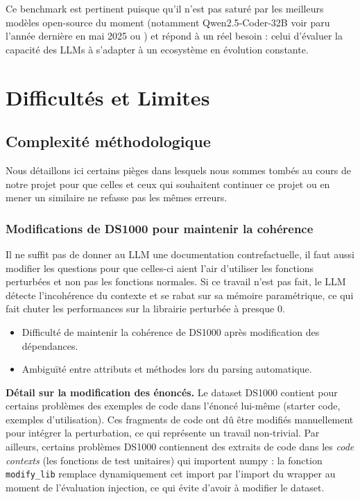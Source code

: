 \documentclass[11pt, a4paper]{article}
\begin{document}
Ce benchmark est pertinent puisque qu'il n'est pas saturé par les meilleurs modèles open-source du moment (notamment Qwen2.5-Coder-32B voir \cite{ouyang2025dscodebenchrealisticbenchmarkdata} paru l'année dernière en mai 2025 ou \cite{vellumbenchmark}) et répond à un réel besoin : celui d'évaluer la capacité des LLMs à s'adapter à un ecosystème en évolution constante.

\section{Difficultés et Limites}

\subsection{Complexité méthodologique}

Nous détaillons ici certains pièges dans lesquels nous sommes tombés au cours de notre projet pour que celles et ceux qui souhaitent continuer ce projet ou en mener un similaire ne refasse pas les mêmes erreurs.

\subsubsection{Modifications de DS1000 pour maintenir la cohérence}

Il ne suffit pas de donner au LLM une documentation contrefactuelle, il faut aussi modifier les questions pour que celles-ci aient l'air d'utiliser les fonctions perturbées et non pas les fonctions normales. Si ce travail n'est pas fait, le LLM détecte l'incohérence du contexte et se rabat sur sa mémoire paramétrique, ce qui fait chuter les performances sur la librairie perturbée à presque 0.

\begin{itemize}
    \item Difficulté de maintenir la cohérence de DS1000 après modification des dépendances.
    \item Ambiguïté entre attributs et méthodes lors du parsing automatique.
\end{itemize}

\textbf{Détail sur la modification des énoncés.} Le dataset DS1000 contient pour certains problèmes des exemples de code dans l'énoncé lui-même (starter code, exemples d'utilisation). Ces fragments de code ont dû être modifiés manuellement pour intégrer la perturbation, ce qui représente un travail non-trivial. Par ailleurs, certains problèmes DS1000 contiennent des extraits de code dans les \textit{code contexts} (les fonctions de test unitaires) qui importent numpy : la fonction \texttt{modify\_lib} remplace dynamiquement cet import par l'import du wrapper au moment de l'évaluation injection, ce qui évite d'avoir à modifier le dataset.
\end{document}
